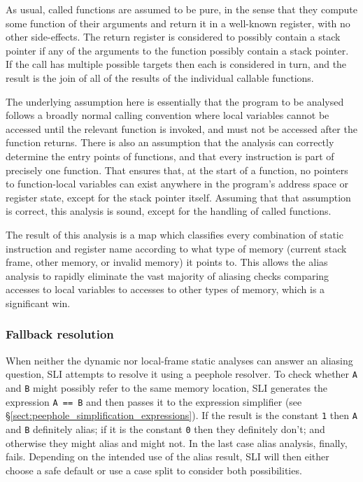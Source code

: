 \documentclass[12pt,a4paper]{book}
\begin{document}
As usual, called functions are assumed to be pure, in the sense that they compute some function of their arguments and return it in a well-known register, with no other side-effects.
The return register is considered to possibly contain a stack pointer if any of the arguments to the function possibly contain a stack pointer.
If the call has multiple possible targets then each is considered in turn, and the result is the join of all of the results of the individual callable functions.

The underlying assumption here is essentially that the program to be analysed follows a broadly normal calling convention where local variables cannot be accessed until the relevant function is invoked, and must not be accessed after the function returns.
There is also an assumption that the analysis can correctly determine the entry points of functions, and that every instruction is part of precisely one function.
That ensures that, at the start of a function, no pointers to function-local variables can exist anywhere in the program's address space or register state, except for the stack pointer itself.
Assuming that that assumption is correct, this analysis is sound, except for the handling of called functions.

The result of this analysis is a map which classifies every combination of static instruction and register name according to what type of memory (current stack frame, other memory, or invalid memory) it points to.
This allows the alias analysis to rapidly eliminate the vast majority of aliasing checks comparing accesses to local variables to accesses to other types of memory, which is a significant win.

\subsubsection{Fallback resolution}
When neither the dynamic nor local-frame static analyses can answer an aliasing question, SLI attempts to resolve it using a peephole resolver.
To check whether \verb|A| and \verb|B| might possibly refer to the same memory location, SLI generates the expression \verb|A == B| and then passes it to the expression simplifier (see \S\ref{sect:peephole_simplification_expressions}).
If the result is the constant \verb|1| then \verb|A| and \verb|B| definitely alias; if it is the constant \verb|0| then they definitely don't; and otherwise they might alias and might not.
In the last case alias analysis, finally, fails.
Depending on the intended use of the alias result, SLI will then either choose a safe default or use a case split to consider both possibilities.
\end{document}
